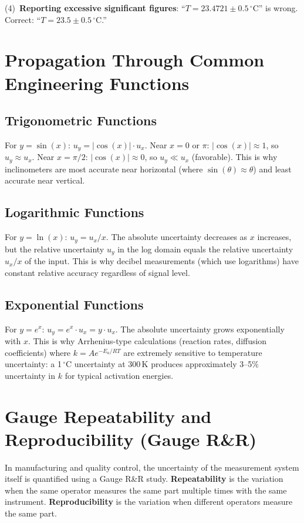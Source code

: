 \documentclass[11pt,letterpaper,twoside,openany]{book}
\newcommand{\degC}{\ensuremath{{}^{\circ}\text{C}}}
\begin{document}
(4)~\textbf{Reporting excessive significant figures}: ``$T = 23.4721 \pm 0.5$\,\degC{}'' is wrong. Correct: ``$T = 23.5 \pm 0.5$\,\degC{}.''
\section{Propagation Through Common Engineering Functions}
\subsection{Trigonometric Functions}
For $y = \sin(x)$: $u_y = |\cos(x)| \cdot u_x$. Near $x = 0$ or $\pi$: $|\cos(x)| \approx 1$, so $u_y \approx u_x$. Near $x = \pi/2$: $|\cos(x)| \approx 0$, so $u_y \ll u_x$ (favorable). This is why inclinometers are most accurate near horizontal (where $\sin(\theta) \approx \theta$) and least accurate near vertical.

\subsection{Logarithmic Functions}
For $y = \ln(x)$: $u_y = u_x / x$. The absolute uncertainty decreases as $x$ increases, but the relative uncertainty $u_y$ in the log domain equals the relative uncertainty $u_x/x$ of the input. This is why decibel measurements (which use logarithms) have constant relative accuracy regardless of signal level.

\subsection{Exponential Functions}
For $y = e^x$: $u_y = e^x \cdot u_x = y \cdot u_x$. The absolute uncertainty grows exponentially with $x$. This is why Arrhenius-type calculations (reaction rates, diffusion coefficients) where $k = A e^{-E_a/RT}$ are extremely sensitive to temperature uncertainty: a 1\,\degC{} uncertainty at 300\,K produces approximately 3--5\% uncertainty in $k$ for typical activation energies.

\section{Gauge Repeatability and Reproducibility (Gauge R\&R)}
In manufacturing and quality control, the uncertainty of the measurement system itself is quantified using a Gauge R\&R study. \textbf{Repeatability} is the variation when the same operator measures the same part multiple times with the same instrument. \textbf{Reproducibility} is the variation when different operators measure the same part.
\end{document}
